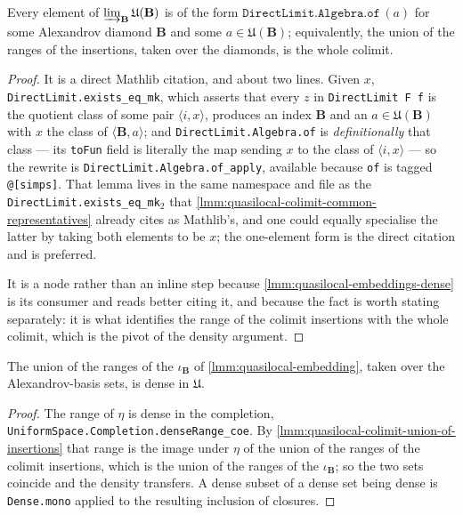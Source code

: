 \begin{lemma}
    \label{lmm:quasilocal-colimit-union-of-insertions}
    \leanok
    Every element of $\varinjlim_{\mathbf{B}} \mathfrak{U}(\mathbf{B})$ is of the form $\texttt{DirectLimit.Algebra.of}\,(a)$ for some Alexandrov diamond $\mathbf{B}$ and some $a \in \mathfrak{U}(\mathbf{B})$; equivalently, the union of the ranges of the insertions, taken over the diamonds, is the whole colimit.
\end{lemma}
\begin{proof}
    \leanok
    It is a direct Mathlib citation, and about two lines. Given $x$, \texttt{DirectLimit.exists\_eq\_mk}, which asserts that every $z$ in \texttt{DirectLimit F f} is the quotient class of some pair $\langle i, x \rangle$, produces an index $\mathbf{B}$ and an $a \in \mathfrak{U}(\mathbf{B})$ with $x$ the class of $\langle \mathbf{B}, a \rangle$; and \texttt{DirectLimit.Algebra.of} is \emph{definitionally} that class --- its \texttt{toFun} field is literally the map sending $x$ to the class of $\langle i, x \rangle$ --- so the rewrite is \texttt{DirectLimit.Algebra.of\_apply}, available because \texttt{of} is tagged \texttt{@[simps]}. That lemma lives in the same namespace and file as the \texttt{DirectLimit.exists\_eq\_mk\ensuremath{{}_2}} that \ref{lmm:quasilocal-colimit-common-representatives} already cites as Mathlib's, and one could equally specialise the latter by taking both elements to be $x$; the one-element form is the direct citation and is preferred.

    It is a node rather than an inline step because \ref{lmm:quasilocal-embeddings-dense} is its consumer and reads better citing it, and because the fact is worth stating separately: it is what identifies the range of the colimit insertions with the whole colimit, which is the pivot of the density argument.
\end{proof}

\begin{lemma}
    \label{lmm:quasilocal-embeddings-dense}
    \leanok
    The union of the ranges of the $\iota_{\mathbf{B}}$ of \ref{lmm:quasilocal-embedding}, taken over the Alexandrov-basis sets, is dense in $\mathfrak{U}$.
\end{lemma}
\begin{proof}
    \leanok
    The range of $\eta$ is dense in the completion, \texttt{UniformSpace.Completion.denseRange\_coe}. By \ref{lmm:quasilocal-colimit-union-of-insertions} that range is the image under $\eta$ of the union of the ranges of the colimit insertions, which is the union of the ranges of the $\iota_{\mathbf{B}}$; so the two sets coincide and the density transfers. A dense subset of a dense set being dense is \texttt{Dense.mono} applied to the resulting inclusion of closures.
\end{proof}

